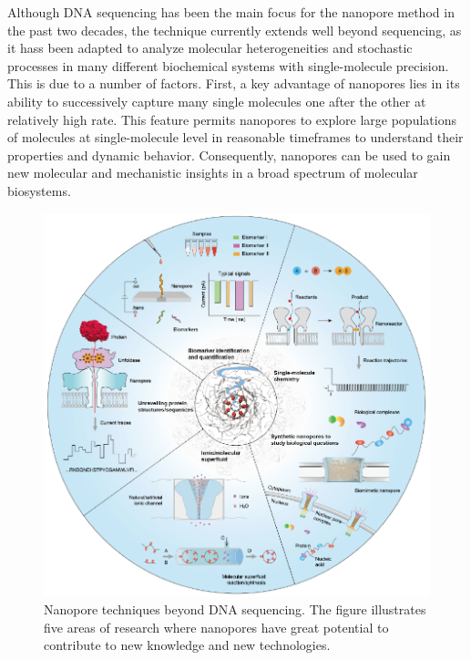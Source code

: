 Although DNA sequencing has been the main focus for the nanopore method in the past two decades, the technique currently extends well beyond sequencing, as it hass been adapted to analyze molecular heterogeneities and stochastic processes in many different biochemical systems with single-molecule precision. This is due to a number of factors. First, a key advantage of nanopores lies in its ability to successively capture many single molecules one after the other at relatively high rate. This feature permits nanopores to explore large populations of molecules at single-molecule level in reasonable timeframes to understand their properties and dynamic behavior. Consequently, nanopores can be used to gain new molecular and mechanistic insights in a broad spectrum of molecular biosystems. 
\begin{figure}[!htbp]
	\centering
	\includegraphics[width=1\linewidth]{figures/Figure6.1.pdf}
	\caption{Nanopore techniques beyond DNA sequencing. The figure illustrates five areas of research where nanopores have great potential to contribute to new knowledge and new technologies.}
	\label{fig:fig6.1}
\end{figure}
